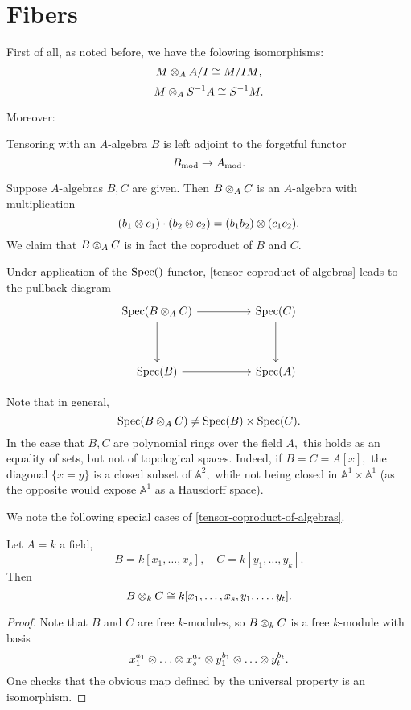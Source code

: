 \section{Fibers}

First of all, as noted before, we have the folowing isomorphisms:
\[ M \otimes_A A /{I} \cong M /{IM},\]
\[ M \otimes_A S^{-1}A \cong S^{-1} M.\]

Moreover:
\begin{prop}
Tensoring with an $A$-algebra $B$ is left adjoint to the forgetful functor
\[ B_\text{mod} \to A_\text{mod}.\]
\end{prop}

\begin{prop}
  \label{tensor-coproduct-of-algebras}
Suppose $A$-algebras $B, C$ are given. Then
\( B \otimes_A C\)
is an $A$-algebra with multiplication
\[ (b_1 \otimes c_1) \cdot (b_2 \otimes c_2) = (b_1 b_2) \otimes (c_1 c_2).\]
We claim that
\( B \otimes_A C\)
is in fact the coproduct of $B$ and $C$.
\end{prop}

\begin{note}
Under application of the \(\text{Spec}()\) functor, \cref{tensor-coproduct-of-algebras} leads to the pullback diagram
\begin{equation*}
  \begin{tikzcd}[column sep = huge, row sep = huge]
    \spec(B \tensor_A C) \arrow{d} \arrow{r}
    & \spec(C) \arrow{d} \\
    \spec(B) \arrow{r}
    & \spec(A)
  \end{tikzcd}
\end{equation*}
\end{note}

Note that in general,
\[ \text{Spec}(B \otimes_A C) \neq \text{Spec}(B) \times \text{Spec}(C).\]
In the case that \(B, C\) are polynomial rings over the field \(A,\) this holds as an equality of sets, but not of topological spaces. Indeed, if \(B = C = A[x],\) the diagonal \(\{x = y\}\) is a closed subset of \(\mathbb{A}^2,\) while not being closed in \(\mathbb{A}^1 \times \mathbb{A}^1\) (as the opposite would expose \(\mathbb{A}^1\) as a Hausdorff space).

We note the following special cases of \cref{tensor-coproduct-of-algebras}.

\begin{corollary}
  Let $A = k$ a field,
  \[ B = k[x_1, \dotsc, x_s], \quad C = k[y_1, \dotsc, y_k].\]
  Then
  \[ B \otimes_k C \cong k[x_1, \dotsc, x_s, y_1, \dotsc, y_t].\]
\end{corollary}
\begin{proof}
  Note that $B$ and $C$ are free $k$-modules, so $B \otimes_k C$ is a free $k$-module with basis
  \[x_1^{a_1} \otimes \dotso \otimes x_s^{a_s} \otimes y_1^{b_1} \otimes \dotso \otimes y_t^{b_t}.\]
  One checks that the obvious map defined by the universal property is an isomorphism.
\end{proof}

